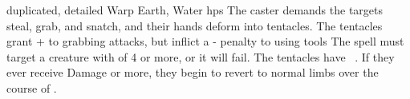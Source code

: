   {duplicated, detailed}%
  {Warp}%
  {Earth, Water}%
  {\glspl{hp}}%
  {The caster demands the targets steal, grab, and snatch, and their hands deform into  tentacles.
  The tentacles grant + to grabbing attacks, but inflict a - penalty to using tools}%
  {
  The spell must target a creature with  of 4 or more, or it will fail.
  The tentacles have ~.
  If they ever receive  Damage or more, they begin to revert to normal limbs over the course of .}
